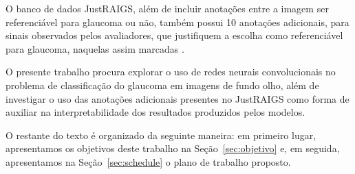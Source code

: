 \documentclass[12pt]{article}
\begin{document}

O banco de dados JustRAIGS, além de incluir anotações entre a imagem ser referenciável para glaucoma ou não, também possui 10 anotações adicionais, para sinais observados pelos avaliadores, que justifiquem a escolha como referenciável para glaucoma, naquelas assim marcadas \cite{justraigs_article}.

O presente trabalho procura explorar o uso de redes neurais convolucionais no problema de classificação do glaucoma em imagens de fundo olho, além de investigar o uso das anotações adicionais presentes no JustRAIGS como forma de auxiliar na interpretabilidade dos resultados produzidos pelos modelos.

O restante do texto é organizado da seguinte maneira: em primeiro lugar, apresentamos os objetivos deste trabalho na Seção~\ref{sec:objetivo} e, em seguida, apresentamos na Seção~\ref{sec:schedule} o plano de trabalho proposto.
\end{document}
